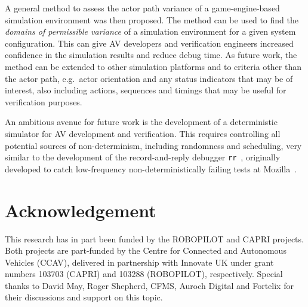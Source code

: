 A general method to assess the actor path variance of a game-engine-based simulation environment was then proposed. The method can be used to find the \textit{domains of permissible variance} of a simulation environment for a given system configuration. This can give AV developers and verification engineers increased confidence in the simulation results and reduce debug time. As future work, the method can be extended to other simulation platforms and to criteria other than the actor path, e.g.\ actor orientation and any status indicators that may be of interest, also including actions, sequences and timings that may be useful for verification purposes.

An ambitious avenue for future work is the development of a deterministic simulator for AV development and verification. This requires controlling all potential sources of non-determinism, including randomness and scheduling, very similar to the development of the record-and-reply debugger \texttt{rr}~\cite{RR_link}, originally developed to catch low-frequency non-deterministically failing tests at Mozilla~\cite{acm-q-rr-interview}.

\section{Acknowledgement}
This research has in part been funded by the ROBOPILOT and CAPRI projects. Both projects are part-funded by the Centre for Connected and Autonomous Vehicles (CCAV), delivered in partnership with Innovate UK under grant numbers 103703 (CAPRI) and 103288 (ROBOPILOT), respectively. Special thanks to David May, Roger Shepherd, CFMS, Auroch Digital and Fortelix for their discussions and support on this topic.  
